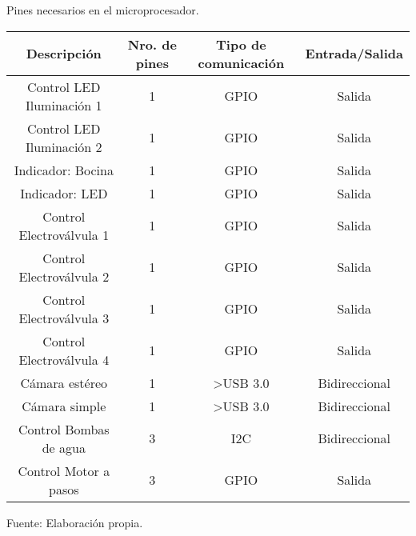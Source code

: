 

\begin{mytable}[H]
	\centering
	\caption{Pines necesarios en el microprocesador.}
	\label{tab:pines necesarios en el microprocesador}
	\begin{tabular}{|c|c|c|c|}
		\hline
		\textbf{Descripción} & \textbf{Nro. de pines} & \textbf{Tipo de comunicación} & \textbf{Entrada/Salida} \\ \hline
		Control LED Iluminación 1 & 1 & GPIO                  & Salida        \\ \hline
		Control LED Iluminación 2 & 1 & GPIO                  & Salida        \\ \hline
		Indicador: Bocina         & 1 & GPIO                  & Salida        \\ \hline
		Indicador: LED            & 1 & GPIO                  & Salida        \\ \hline
		Control Electroválvula 1  & 1 & GPIO                  & Salida        \\ \hline
		Control Electroválvula 2  & 1 & GPIO                  & Salida        \\ \hline
		Control Electroválvula 3  & 1 & GPIO                  & Salida        \\ \hline
		Control Electroválvula 4  & 1 & GPIO                  & Salida        \\ \hline
		Cámara estéreo            & 1 & \textgreater{}USB 3.0 & Bidireccional \\ \hline
		Cámara simple             & 1 & \textgreater{}USB 3.0 & Bidireccional \\ \hline
		Control Bombas de agua    & 3 & I2C                   & Bidireccional \\ \hline
		Control Motor a pasos     & 3 & GPIO                  & Salida        \\ \hline
	\end{tabular}
	\begin{flushleft}	
	Fuente: Elaboración propia.
	\end{flushleft}
\end{mytable}

